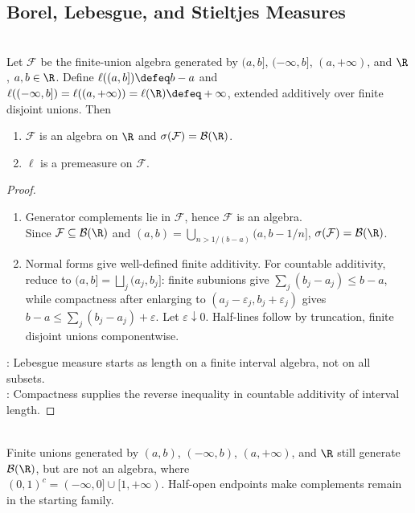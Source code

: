 \subsection{Borel, Lebesgue, and Stieltjes Measures}

\begin{proposition} \label{prop:half-open-real-line-length-premeasure} \\
Let $\mathcal{F}$ be the finite-union algebra generated by $(a,b]$, $(-\infty,b]$, $(a,+\infty)$, and $\R$, $a,b\in\R$. Define $\ell((a,b])\defeq b-a$ and $\ell((-\infty,b])=\ell((a,+\infty))=\ell(\R)\defeq+\infty$, extended additively over finite disjoint unions. Then
\begin{enumerate}[label=(\roman*)]
\setlength{\itemsep}{0pt}
\item $\mathcal{F}$ is an algebra on $\R$ and $\sigma(\mathcal{F})=\mathcal{B}(\R)$.
\item $\ell$ is a premeasure on $\mathcal{F}$.
\end{enumerate}
\begin{proof}
\begin{enumerate}[label=(\roman*)]
\setlength{\itemsep}{0pt}
\item Generator complements lie in $\mathcal{F}$, hence $\mathcal{F}$ is an algebra.\\
Since $\mathcal{F}\subseteq\mathcal{B}(\R)$ and $(a,b)=\bigcup_{n>1/(b-a)}(a,b-1/n]$, $\sigma(\mathcal{F})=\mathcal{B}(\R)$.
\item Normal forms give well-defined finite additivity. For countable additivity, reduce to $(a,b]=\bigsqcup_j(a_j,b_j]$: finite subunions give $\sum_j(b_j-a_j)\leq b-a$, while compactness after enlarging to $(a_j-\varepsilon_j,b_j+\varepsilon_j)$ gives $b-a\leq\sum_j(b_j-a_j)+\varepsilon$. Let $\varepsilon\downarrow0$. Half-lines follow by truncation, finite disjoint unions componentwise.
\end{enumerate}
: Lebesgue measure starts as length on a finite interval algebra, not on all subsets.\\
: Compactness supplies the reverse inequality in countable additivity of interval length.
\end{proof}
\end{proposition}

\begin{remark} \label{rem:half-open-endpoints-make-an-algebra} \\
Finite unions generated by $(a,b)$, $(-\infty,b)$, $(a,+\infty)$, and $\R$ still generate $\mathcal{B}(\R)$, but are not an algebra, where\\
$(0,1)^c=(-\infty,0]\cup[1,+\infty)$. Half-open endpoints make complements remain in the starting family.
\end{remark}

